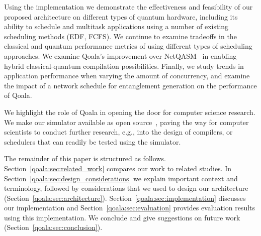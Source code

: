 Using the implementation we demonstrate the effectiveness and feasibility of our proposed architecture on different types of quantum hardware, including its ability to schedule and multitask applications using a number of existing scheduling methods (EDF, FCFS).
We continue to examine tradeoffs in the classical and quantum performance metrics of using different types of scheduling approaches. 
We examine Qoala's improvement over NetQASM~\cite{dahlberg2022netqasm} in enabling hybrid classical-quantum compilation possibilities. 
Finally, we study trends in application performance when varying the amount of concurrency, and examine the impact of a network schedule for entanglement generation on the performance of Qoala.

We highlight the role of Qoala in opening the door for computer science research. We make our simulator available as open source~\cite{qoala2023simulator}, paving the way for computer scientists to conduct further research, e.g., into the design of compilers, or schedulers that can readily be tested using the simulator. 

The remainder of this paper is structured as follows. Section~\ref{qoala:sec:related_work} compares our work to related studies. In Section~\ref{qoala:sec:design_considerations} we explain important context and terminology, followed by considerations that we used to design our architecture (Section~\ref{qoala:sec:architecture}). Section~\ref{qoala:sec:implementation} discusses our implementation and Section~\ref{qoala:sec:evaluation} provides evaluation results using this implementation. We conclude and give suggestions on future work (Section~\ref{qoala:sec:conclusion}).


